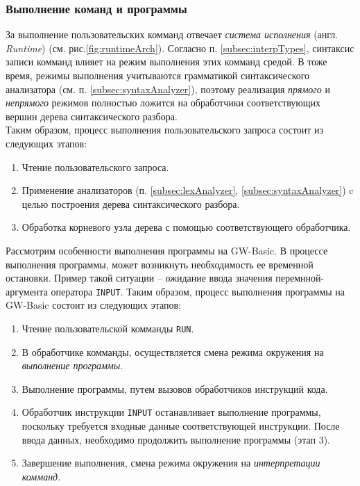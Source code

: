 \documentclass[12pt]{article}
\begin{document}
			\subsubsection{Выполнение команд и программы}
			\hspace{\parindent} За выполнение пользовательских комманд отвечает {\it система исполнения} (англ. {\it Runtime}) (см. рис.\ref{fig:runtimeArch}). Согласно п. \ref{subsec:interpTypes}, синтаксис записи комманд влияет на режим выполнения этих комманд средой. В тоже время, режимы выполнения учитываются грамматикой синтаксического анализатора (см. п. \ref{subsec:syntaxAnalyzer}), поэтому реализация {\it прямого} и {\it непрямого} режимов полностью ложится на обработчики соответствующих вершин дерева синтаксического разбора. \\   
			\indent Таким образом, процесс выполнения пользовательского запроса состоит из следующих этапов:
			\begin{enumerate}
				\item Чтение пользовательского запроса.
				\item Применение анализаторов (п. \ref{subsec:lexAnalyzer}, \ref{subsec:syntaxAnalyzer}) c целью построения дерева синтаксического разбора.
				\item Обработка корневого узла дерева с помощью соответствующего обработчика.
			\end{enumerate}

			\indent Рассмотрим особенности выполнения программы на GW-Basic. В процессе выполнения программы, может возникнуть необходимость ее временной остановки. Пример такой ситуации -- ожидание ввода значения перемнной-аргумента оператора {\tt INPUT}. Таким образом, процесс выполнения программы на GW-Basic состоит из следующих этапов:
			\begin{enumerate}
				\item Чтение пользовательской комманды {\tt RUN}.
				\item В обработчике комманды, осуществляется смена режима окружения на {\it выполнение программы}.
				\item Выполнение программы, путем вызовов обработчиков инструкций кода.
				\item Обработчик инструкции {\tt INPUT} останавливает выполнение программы, поскольку требуется входные данные соответствующей инструкции. После ввода данных, необходимо продолжить выполнение программы (этап 3).
				\item Завершение выполнения, смена режима окружения на {\it интерпретации комманд}.
			\end{enumerate}
\end{document}
